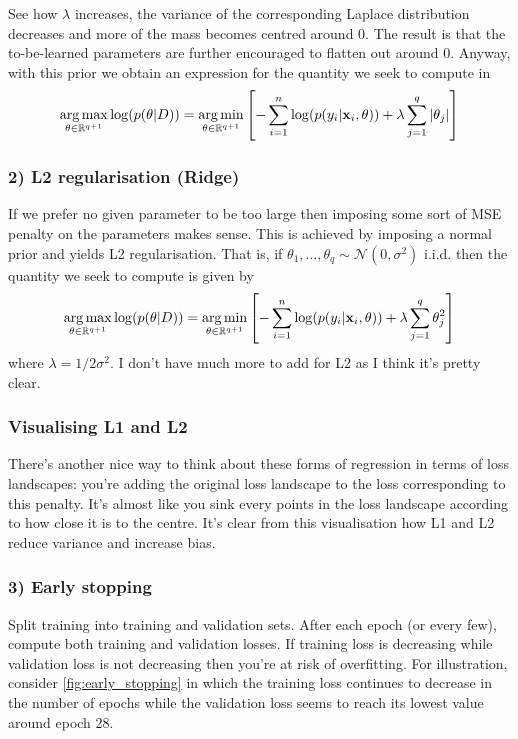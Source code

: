 \documentclass[11pt]{article}
\begin{document}
See how $\lambda$ increases, the variance of the corresponding Laplace distribution decreases and more of the mass becomes centred around 0. The result is that the to-be-learned parameters are further encouraged to flatten out around 0. Anyway, with this prior we obtain an expression for the quantity we seek to compute in
$$
\operatorname*{arg\,max}_{\theta\in\mathbb{R}^{q+1}}\log(p(\theta|D))
=
\operatorname*{arg\,min}_{\theta\in\mathbb{R}^{q+1}}\left[-\sum_{i=1}^n\log(p(y_i|\mathbf{x}_i,\theta))+\lambda\sum_{j=1}^q|\theta_j|\right]
$$

\subsubsection*{2) L2 regularisation (Ridge)}
If we prefer no given parameter to be too large then imposing some sort of MSE penalty on the parameters makes sense. This is achieved by imposing a normal prior and yields L2 regularisation. That is, if $\theta_1,\dots,\theta_q\sim\mathcal{N}(0,\sigma^2)$ i.i.d. then the quantity we seek to compute is given by
$$
\operatorname*{arg\,max}_{\theta\in\mathbb{R}^{q+1}}\log(p(\theta|D))
=
\operatorname*{arg\,min}_{\theta\in\mathbb{R}^{q+1}}\left[-\sum_{i=1}^n\log(p(y_i|\mathbf{x}_i,\theta))+\lambda\sum_{j=1}^q \theta_j^2\right]
$$
where $\lambda=1/2\sigma^2$. I don't have much more to add for L2 as I think it's pretty clear.

\subsubsection*{Visualising L1 and L2}
There's another nice way to think about these forms of regression in terms of loss landscapes: you're adding the original loss landscape to the loss corresponding to this penalty. It's almost like you sink every points in the loss landscape according to how close it is to the centre. It's clear from this visualisation how L1 and L2 reduce variance and increase bias. 

\subsubsection*{3) Early stopping} Split training into training and validation sets. After each epoch (or every few), compute both training and validation losses. If training loss is decreasing while validation loss is not decreasing then you're at risk of overfitting. For illustration, consider \autoref{fig:early_stopping} in which the training loss continues to decrease in the number of epochs while the validation loss seems to reach its lowest value around epoch 28.
\end{document}
